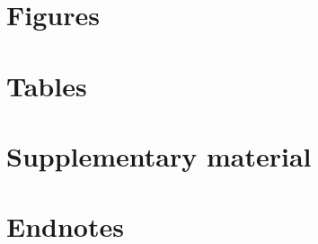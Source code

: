 \documentclass[
]{article}
\begin{document}
\hypertarget{figures}{%
\section{Figures}\label{figures}}

\hypertarget{tables}{%
\section{Tables}\label{tables}}

\hypertarget{supplementary-material}{%
\section{Supplementary material}\label{supplementary-material}}

\hypertarget{endnotes}{%
\section{Endnotes}\label{endnotes}}
\end{document}
